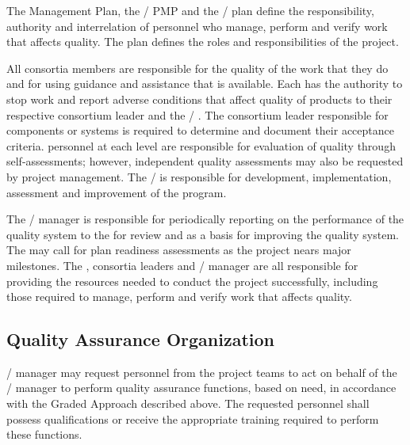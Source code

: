 The  Management Plan, the / PMP
and the /  plan define the
responsibility, authority and interrelation of personnel who manage,
perform and verify work that affects quality. The  plan defines
the  roles and responsibilities of the  project.

All consortia members are responsible for the quality of the work that
they do and for using guidance and assistance that is available. Each
has the authority to stop work and report adverse conditions that
affect quality of  products to their respective  consortium
leader and the / . The consortium leader responsible
for  components or systems is required to determine and document
their acceptance criteria.  personnel at each level are
responsible for evaluation of quality through self-assessments;
however, independent quality assessments may also be requested by
project management.  The /  is responsible for
development, implementation, assessment and improvement of the 
program.

The /  manager is responsible for
periodically reporting on the performance of the quality system to the
  for review and as a basis for
improving the quality system. The  
may call for  plan readiness assessments as the project nears
major milestones. The  , consortia
leaders and /  manager are all responsible
for providing the resources needed to conduct the project
successfully, including those required to manage, perform and verify
work that affects quality.

\subsection{Quality Assurance Organization}

/  manager may request personnel
from the  project teams to act on behalf of the
/  manager to perform quality
assurance functions, based on need, in accordance with the Graded
Approach described above. The requested personnel shall possess
qualifications or receive the appropriate training required to perform
these functions.

